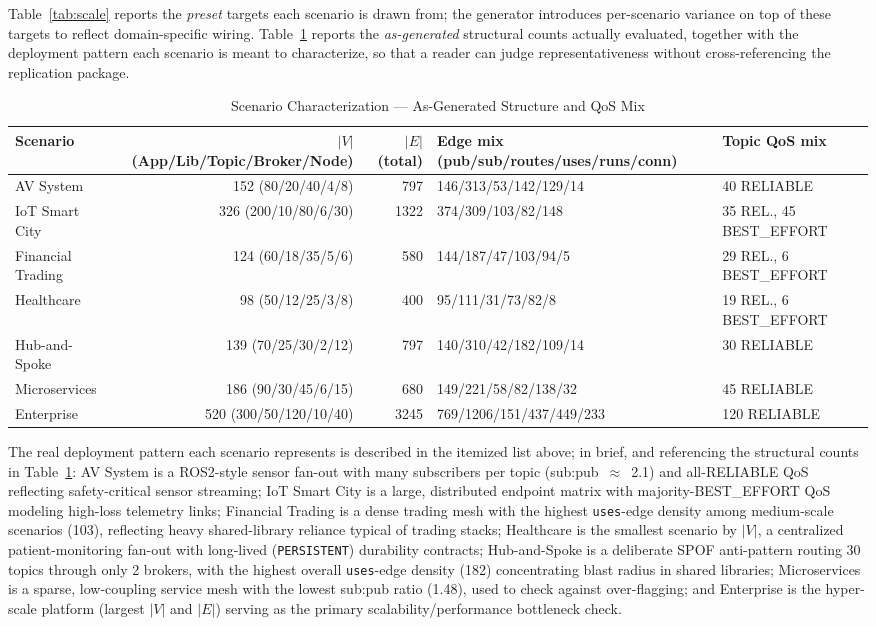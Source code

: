 \documentclass[review]{elsarticle}
\begin{document}
Table~\ref{tab:scale} reports the \emph{preset} targets each scenario is drawn from; the generator
introduces per-scenario variance on top of these targets to reflect domain-specific wiring.
Table~\ref{tab:scenariochar} reports the \emph{as-generated} structural counts actually evaluated,
together with the deployment pattern each scenario is meant to characterize, so that a reader can
judge representativeness without cross-referencing the replication package.

\begin{table}[htbp]
\centering
\small
\caption{Scenario Characterization --- As-Generated Structure and QoS Mix}
\label{tab:scenariochar}
\begin{tabular}{@{}lrrll@{}}
\toprule
Scenario & $|V|$ (App/Lib/Topic/Broker/Node) & $|E|$ (total) & Edge mix (pub/sub/routes/uses/runs/conn) & Topic QoS mix \\
\midrule
AV System & 152 (80/20/40/4/8) & 797 & 146/313/53/142/129/14 & 40 RELIABLE \\
IoT Smart City & 326 (200/10/80/6/30) & 1322 & 374/309/103/82/148 & 35 REL., 45 BEST\_EFFORT \\
Financial Trading & 124 (60/18/35/5/6) & 580 & 144/187/47/103/94/5 & 29 REL., 6 BEST\_EFFORT \\
Healthcare & 98 (50/12/25/3/8) & 400 & 95/111/31/73/82/8 & 19 REL., 6 BEST\_EFFORT \\
Hub-and-Spoke & 139 (70/25/30/2/12) & 797 & 140/310/42/182/109/14 & 30 RELIABLE \\
Microservices & 186 (90/30/45/6/15) & 680 & 149/221/58/82/138/32 & 45 RELIABLE \\
Enterprise & 520 (300/50/120/10/40) & 3245 & 769/1206/151/437/449/233 & 120 RELIABLE \\
\bottomrule
\end{tabular}
\normalsize
\end{table}

The real deployment pattern each scenario represents is described in the itemized list above;
in brief, and referencing the structural counts in Table~\ref{tab:scenariochar}: AV System is a
ROS2-style sensor fan-out with many subscribers per topic (sub:pub~$\approx$~2.1) and
all-RELIABLE QoS reflecting safety-critical sensor streaming; IoT Smart City is a large,
distributed endpoint matrix with majority-BEST\_EFFORT QoS modeling high-loss telemetry links;
Financial Trading is a dense trading mesh with the highest \texttt{uses}-edge density among
medium-scale scenarios (103), reflecting heavy shared-library reliance typical of trading stacks;
Healthcare is the smallest scenario by $|V|$, a centralized patient-monitoring fan-out with
long-lived (\texttt{PERSISTENT}) durability contracts; Hub-and-Spoke is a deliberate SPOF
anti-pattern routing 30 topics through only 2 brokers, with the highest overall \texttt{uses}-edge
density (182) concentrating blast radius in shared libraries; Microservices is a sparse,
low-coupling service mesh with the lowest sub:pub ratio (1.48), used to check against
over-flagging; and Enterprise is the hyper-scale platform (largest $|V|$ and $|E|$) serving as the
primary scalability/performance bottleneck check.
\end{document}
